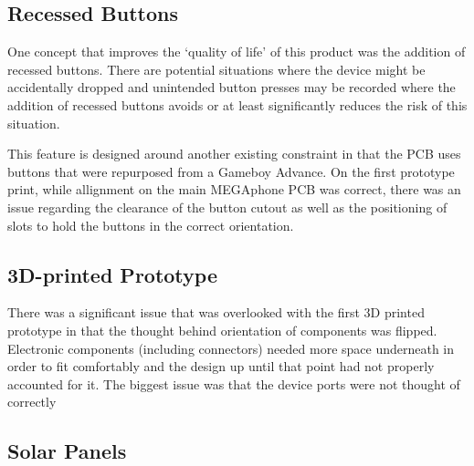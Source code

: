 \subsection{Recessed Buttons}


One concept that improves the ‘quality of life’ of this product was the addition of recessed buttons.
There are potential situations where the device might be accidentally dropped and unintended button presses may be recorded where the addition of recessed buttons avoids or at least significantly reduces the risk of this situation.

This feature is designed around another existing constraint in that the PCB uses buttons that were repurposed from a Gameboy Advance. %
On the first prototype print, while allignment on the main MEGAphone PCB was correct, there was an issue regarding the clearance of the button cutout as well as the positioning of slots to hold the buttons in the correct orientation.


\subsection{3D-printed Prototype}

There was a significant issue that was overlooked with the first 3D printed prototype in that the thought behind orientation of components was flipped.
Electronic components (including connectors) needed more space underneath in order to fit comfortably and the design up until that point had not properly accounted for it.
The biggest issue was that the device ports were not thought of correctly


\subsection{Solar Panels}

